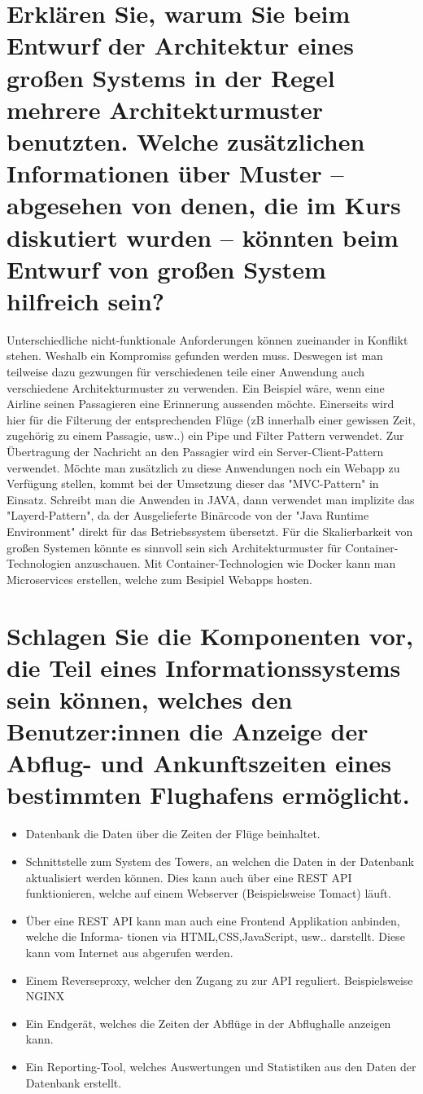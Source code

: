 \documentclass[12pt]{article}
\begin{document}
 \section{Erklären Sie, warum Sie beim Entwurf der Architektur eines großen Systems in der Regel mehrere Architekturmuster benutzten. Welche zusätzlichen Informationen über Muster – abgesehen von denen, die im Kurs diskutiert wurden – könnten beim Entwurf von großen System hilfreich sein?}
Unterschiedliche nicht-funktionale Anforderungen können zueinander in Konflikt stehen. Weshalb ein Kompromiss gefunden werden muss. Deswegen ist man teilweise dazu gezwungen für verschiedenen teile einer Anwendung auch verschiedene Architekturmuster zu verwenden. Ein Beispiel wäre, wenn eine Airline seinen Passagieren eine Erinnerung aussenden möchte. Einerseits wird hier für die Filterung der entsprechenden Flüge (zB innerhalb einer gewissen Zeit, zugehörig zu einem Passagie, usw..) ein Pipe und Filter Pattern verwendet. Zur Übertragung der Nachricht an den Passagier wird ein Server-Client-Pattern verwendet. Möchte man zusätzlich zu diese Anwendungen noch ein Webapp zu Verfügung stellen, kommt bei der Umsetzung dieser das "MVC-Pattern" in Einsatz. Schreibt man die Anwenden in JAVA, dann verwendet man implizite das "Layerd-Pattern", da der Ausgelieferte Binärcode von der "Java Runtime Environment" direkt für das Betriebssystem übersetzt. Für die Skalierbarkeit von großen Systemen könnte es sinnvoll sein sich Architekturmuster für Container-Technologien anzuschauen. Mit Container-Technologien wie Docker kann man Microservices erstellen, welche zum Besipiel Webapps hosten.
\section{Schlagen Sie die Komponenten vor, die Teil eines Informationssystems sein können, welches den Benutzer:innen die Anzeige der Abflug- und Ankunftszeiten eines bestimmten Flughafens ermöglicht.}
\begin{itemize}
 \item Datenbank die Daten über die Zeiten der Flüge beinhaltet.
 \item Schnittstelle zum System des Towers, an welchen die Daten in der Datenbank aktualisiert werden können. Dies kann auch über eine REST API funktionieren, welche auf einem Webserver (Beispielsweise Tomact) läuft.
 \item Über eine REST API kann man auch eine Frontend Applikation anbinden, welche die Informa- tionen via HTML,CSS,JavaScript, usw.. darstellt. Diese kann vom Internet aus abgerufen werden.
 \item Einem Reverseproxy, welcher den Zugang zu zur API reguliert. Beispielsweise NGINX
 \item Ein Endgerät, welches die Zeiten der Abflüge in der Abflughalle anzeigen kann.
 \item Ein Reporting-Tool, welches Auswertungen und Statistiken aus den Daten der Datenbank erstellt.
\end{itemize}
\pagebreak
\end{document}
